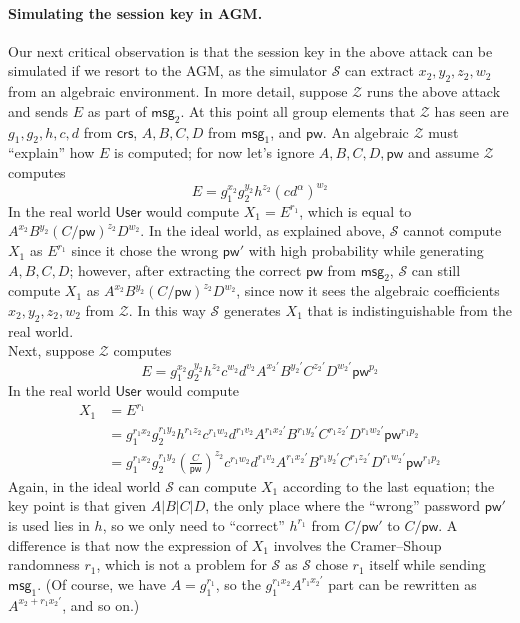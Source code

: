 \documentclass[12pt,a4paper]{article}
\newcommand{\simulator}{\mathcal{S}}
\newcommand{\env}{\mathcal{Z}}
\newcommand{\user}{\mathsf{User}}
\newcommand{\pw}{\mathsf{pw}}
\newcommand{\crs}{\mathsf{crs}}
\newcommand{\msg}[1]{\mathsf{msg}_{#1}}
\begin{document}
\paragraph{Simulating the session key in AGM.}

Our next critical observation is that the session key in the above attack can be simulated if we resort to the AGM, as the simulator $\simulator$ can extract $x_2, y_2, z_2, w_2$ from an algebraic environment. In more detail, suppose $\env$ runs the above attack and sends $E$ as part of $\msg{2}$. At this point all group elements that $\env$ has seen are $g_1,g_2,h,c,d$ from $\crs$, $A,B,C,D$ from $\msg{1}$, and $\pw$. An algebraic $\env$ must ``explain'' how $E$ is computed; for now let's ignore $A,B,C,D,\pw$ and assume $\env$ computes
\[
E = g_1^{x_2}g_2^{y_2}h^{z_2}(cd^\alpha)^{w_2}
\]
In the real world $\user$ would compute $X_1 = E^{r_1}$, which is equal to $A^{x_2}B^{y_2}(C/\pw)^{z_2}D^{w_2}$. In the ideal world, as explained above, $\simulator$ cannot compute $X_1$ as $E^{r_1}$ since it chose the wrong $\pw'$ with high probability while generating $A,B,C,D$; however, after extracting the correct $\pw$ from $\msg{2}$, $\simulator$ can still compute $X_1$ as $A^{x_2}B^{y_2}(C/\pw)^{z_2}D^{w_2}$, since now it sees the algebraic coefficients $x_2,y_2,z_2,w_2$ from $\env$. In this way $\simulator$ generates $X_1$ that is indistinguishable from the real world.\\

Next, suppose $\env$ computes
\[
E = g_1^{x_2}g_2^{y_2}h^{z_2}c^{w_2}d^{v_2}A^{x_2'}B^{y_2'}C^{z_2'}D^{w_2'}\pw^{p_2}
\]
In the real world $\user$ would compute
\begin{align*}
X_1 &= E^{r_1} \\
    &= g_1^{r_1x_2} g_2^{r_1y_2} h^{r_1z_2} c^{r_1w_2} d^{r_1v_2} A^{r_1x_2'} B^{r_1y_2'} C^{r_1z_2'} D^{r_1w_2'} \pw^{r_1p_2} \\
    &= g_1^{r_1x_2} g_2^{r_1y_2} \left(\frac{C}{\pw}\right)^{z_2} c^{r_1w_2} d^{r_1v_2} A^{r_1x_2'} B^{r_1y_2'} C^{r_1z_2'} D^{r_1w_2'} \pw^{r_1p_2}
\end{align*}	
Again, in the ideal world $\simulator$ can compute $X_1$ according to the last equation; the key point is that given $A|B|C|D$, the only place where the ``wrong'' password $\pw'$ is used lies in $h$, so we only need to ``correct'' $h^{r_1}$ from $C/\pw'$ to $C/\pw$. A difference is that now the expression of $X_1$ involves the Cramer--Shoup randomness $r_1$, which is not a problem for $\simulator$ as $\simulator$ chose $r_1$ itself while sending $\msg{1}$. (Of course, we have $A = g_1^{r_1}$, so the $g_1^{r_1x_2} A^{r_1x_2'}$ part can be rewritten as $A^{x_2+r_1x_2'}$, and so on.)
\end{document}
